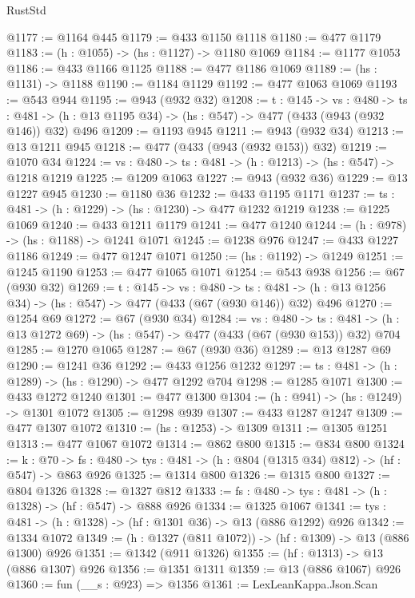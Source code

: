 \begin{lexlean}{RustStd}
\begin{coremodule}
{\begin{coremodule}
{{{{@1177 := @1164 @445
@1179 := @433 @1150 @1118
@1180 := @477 @1179
@1183 := (h : @1055) -> (hs : @1127) -> @1180 @1069
@1184 := @1177 @1053
@1186 := @433 @1166 @1125
@1188 := @477 @1186 @1069
@1189 := (hs : @1131) -> @1188
@1190 := @1184 @1129
@1192 := @477 @1063 @1069
@1193 := @543 @944
@1195 := @943 (@932 @32)
@1208 := {t : @145} ->
  {vs : @480} ->
  {ts : @481} -> (h : @13 @1195 @34) -> (hs : @547) -> @477 (@433 (@943 (@932 @146)) @32) @496
@1209 := @1193 @945
@1211 := @943 (@932 @34)
@1213 := @13 @1211 @945
@1218 := @477 (@433 (@943 (@932 @153)) @32)
@1219 := @1070 @34
@1224 := {vs : @480} -> {ts : @481} -> (h : @1213) -> (hs : @547) -> @1218 @1219
@1225 := @1209 @1063
@1227 := @943 (@932 @36)
@1229 := @13 @1227 @945
@1230 := @1180 @36
@1232 := @433 @1195 @1171
@1237 := {ts : @481} -> (h : @1229) -> (hs : @1230) -> @477 @1232 @1219
@1238 := @1225 @1069
@1240 := @433 @1211 @1179
@1241 := @477 @1240
@1244 := (h : @978) -> (hs : @1188) -> @1241 @1071
@1245 := @1238 @976
@1247 := @433 @1227 @1186
@1249 := @477 @1247 @1071
@1250 := (hs : @1192) -> @1249
@1251 := @1245 @1190
@1253 := @477 @1065 @1071
@1254 := @543 @938
@1256 := @67 (@930 @32)
@1269 := {t : @145} ->
  {vs : @480} ->
  {ts : @481} -> (h : @13 @1256 @34) -> (hs : @547) -> @477 (@433 (@67 (@930 @146)) @32) @496
@1270 := @1254 @69
@1272 := @67 (@930 @34)
@1284 := {vs : @480} ->
  {ts : @481} -> (h : @13 @1272 @69) -> (hs : @547) -> @477 (@433 (@67 (@930 @153)) @32) @704
@1285 := @1270 @1065
@1287 := @67 (@930 @36)
@1289 := @13 @1287 @69
@1290 := @1241 @36
@1292 := @433 @1256 @1232
@1297 := {ts : @481} -> (h : @1289) -> (hs : @1290) -> @477 @1292 @704
@1298 := @1285 @1071
@1300 := @433 @1272 @1240
@1301 := @477 @1300
@1304 := (h : @941) -> (hs : @1249) -> @1301 @1072
@1305 := @1298 @939
@1307 := @433 @1287 @1247
@1309 := @477 @1307 @1072
@1310 := (hs : @1253) -> @1309
@1311 := @1305 @1251
@1313 := @477 @1067 @1072
@1314 := @862 @800
@1315 := @834 @800
@1324 := {k : @70} ->
  {fs : @480} -> {tys : @481} -> (h : @804 (@1315 @34) @812) -> (hf : @547) -> @863 @926
@1325 := @1314 @800
@1326 := @1315 @800
@1327 := @804 @1326
@1328 := @1327 @812
@1333 := {fs : @480} -> {tys : @481} -> (h : @1328) -> (hf : @547) -> @888 @926
@1334 := @1325 @1067
@1341 := {tys : @481} -> (h : @1328) -> (hf : @1301 @36) -> @13 (@886 @1292) @926
@1342 := @1334 @1072
@1349 := (h : @1327 (@811 @1072)) -> (hf : @1309) -> @13 (@886 @1300) @926
@1351 := @1342 (@911 @1326)
@1355 := (hf : @1313) -> @13 (@886 @1307) @926
@1356 := @1351 @1311
@1359 := @13 (@886 @1067) @926
@1360 := fun (__s : @923) => @1356
@1361 := LexLeanKappa.Json.Scan
}}}}
\end{coremodule}}
\end{coremodule}
\end{lexlean}
